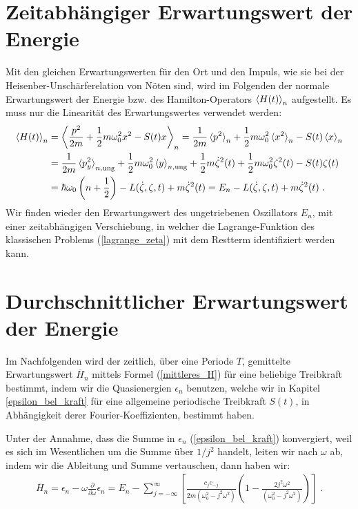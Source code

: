   \section{Zeitabhängiger Erwartungswert der Energie}
    Mit den gleichen Erwartungswerten für den Ort und den Impuls, wie sie bei der Heisenber-Unschärferelation von Nöten sind, wird im Folgenden der normale Erwartungswert der Energie bzw. des Hamilton-Operators $\braket{H(t)}_n$ aufgestellt.
    Es muss nur die Linearität des Erwartungswertes verwendet werden:
    \begin{align}
      \braket{H(t)}_n &= \Braket{\frac{p^2}{2m} + \frac{1}{2}m\omega_0^2x^2 - S(t)x}_n
      =\frac{1}{2m}\braket{p^2}_n + \frac{1}{2}m\omega_0^2\braket{x^2}_n - S(t)\braket{x}_n \notag\\
      &= \frac{1}{2m}\braket{p^2_y}_{n,\text{ung}} + \frac{1}{2}m\omega_0^2\braket{y}_{n,\text{ung}} + \frac{1}{2}m\dot{\zeta}^2(t) + \frac{1}{2}m\omega_0^2\zeta^2(t) - S(t)\zeta(t) \notag\\
      &= \hbar\omega_0\left(n+\frac{1}{2}\right) - L(\dot{\zeta},\zeta,t) + m\dot{\zeta}^2(t) = E_n - L(\dot{\zeta},\zeta,t) + m\dot{\zeta}^2(t) \; .
    \end{align}
    Wir finden wieder den Erwartungswert des ungetriebenen Oszillators $E_n$, mit einer zeitabhängigen Verschiebung, in welcher die Lagrange-Funktion des klassischen Problems (\ref{lagrange_zeta}) mit dem Restterm identifiziert werden kann.

  \section{Durchschnittlicher Erwartungswert der Energie}
    Im Nachfolgenden wird der zeitlich, über eine Periode $T$, gemittelte Erwartungswert $\overline{H}_n$ mittels Formel (\ref{mittleres_H}) für eine beliebige Treibkraft bestimmt, indem wir die Quasienergien $\epsilon_n$ benutzen, welche wir in Kapitel \ref{epsilon_bel_kraft} für eine allgemeine periodische Treibkraft $S(t)$, in Abhängigkeit derer Fourier-Koeffizienten, bestimmt haben.

    Unter der Annahme, dass die Summe in $\epsilon_n$ (\ref{epsilon_bel_kraft}) konvergiert, weil es sich im Wesentlichen um die Summe über $1/j^2$ handelt, leiten wir nach $\omega$ ab, indem wir die Ableitung und Summe vertauschen, dann haben wir:
    \begin{align}
      \overline{H}_n = \epsilon_n - \omega\frac{\partial}{\partial \omega}\epsilon_n
      = E_n - \sum_{j=-\infty}^{\infty} \left[ \frac{c_jc_{-j}}{2m(\omega_0^2-j^2\omega^2)}\left( 1-\frac{2j^2\omega^2}{(\omega_0^2-j^2\omega^2)}\right) \right] \; .
    \end{align}

